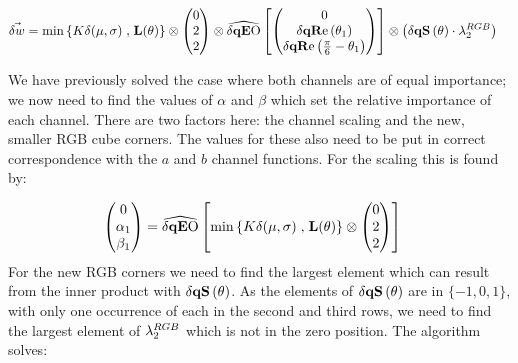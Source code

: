 \begin{align*}
\dW    &=  \min\left\{K \delta(\mu,\sigma) \right. ,  \left. \mathbf{L}(\theta) \right\} 
 \otimes 
        \begin{pmatrix}  0   \\   2   \\  2    \\ \end{pmatrix} 
  \otimes
        \dqEO\left[   \begin{pmatrix}  0   \\ \dqRe[ \thetaA ]  \\ \dqRe[ \Pii{6} -\thetaA]   \\ \end{pmatrix}  \right]
 \otimes
        \left( \dqs[\theta]  \cdot \discard^{RGB}_2 \right) 
\end{align*}

We have previously solved the case where both channels are of equal importance; we now need to find the values of $\alpha$ and $\beta$ which set the relative importance of each channel. There are two factors here: the channel scaling and the new, smaller RGB cube corners. The values for these also need to be put in correct correspondence with the $a$ and $b$ channel functions. For the scaling this is found by:

\begin{align*}
 \begin{pmatrix}  0   \\   \alpha_1   \\  \beta_1   \\ \end{pmatrix}     &=  
\dqEO\left[  \min\left\{K \delta(\mu,\sigma) \right. ,  \left. \mathbf{L}(\theta) \right\} 
 \otimes 
        \begin{pmatrix}  0   \\   2   \\  2    \\ \end{pmatrix} \right]
\end{align*}
For the new RGB corners we need to find the largest element which can result from the inner product with $\dqs[\theta]$. As the elements of $\dqs[\theta]$ are in $\{-1,0,1\}$, with only one occurrence of each in the second and third rows, we need to find the largest element of $\lambda^{RGB}_2$ which is not in the zero position. The algorithm solves:

